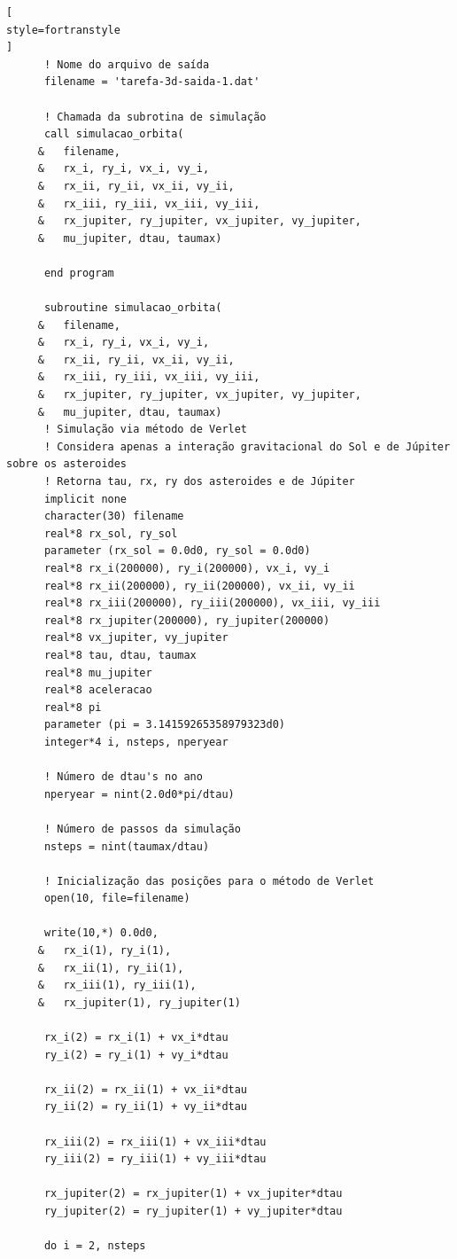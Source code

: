 \documentclass[12pt,a4paper]{article}
\begin{document}
\begin{lstlisting}[
style=fortranstyle
]
      ! Nome do arquivo de saída
      filename = 'tarefa-3d-saida-1.dat'

      ! Chamada da subrotina de simulação
      call simulacao_orbita(
     &   filename,
     &   rx_i, ry_i, vx_i, vy_i,
     &   rx_ii, ry_ii, vx_ii, vy_ii,
     &   rx_iii, ry_iii, vx_iii, vy_iii,
     &   rx_jupiter, ry_jupiter, vx_jupiter, vy_jupiter,
     &   mu_jupiter, dtau, taumax)

      end program

      subroutine simulacao_orbita(
     &   filename,
     &   rx_i, ry_i, vx_i, vy_i,
     &   rx_ii, ry_ii, vx_ii, vy_ii,
     &   rx_iii, ry_iii, vx_iii, vy_iii,
     &   rx_jupiter, ry_jupiter, vx_jupiter, vy_jupiter,
     &   mu_jupiter, dtau, taumax)
      ! Simulação via método de Verlet
      ! Considera apenas a interação gravitacional do Sol e de Júpiter sobre os asteroides
      ! Retorna tau, rx, ry dos asteroides e de Júpiter
      implicit none
      character(30) filename
      real*8 rx_sol, ry_sol
      parameter (rx_sol = 0.0d0, ry_sol = 0.0d0)
      real*8 rx_i(200000), ry_i(200000), vx_i, vy_i
      real*8 rx_ii(200000), ry_ii(200000), vx_ii, vy_ii
      real*8 rx_iii(200000), ry_iii(200000), vx_iii, vy_iii
      real*8 rx_jupiter(200000), ry_jupiter(200000)
      real*8 vx_jupiter, vy_jupiter
      real*8 tau, dtau, taumax
      real*8 mu_jupiter
      real*8 aceleracao
      real*8 pi
      parameter (pi = 3.14159265358979323d0)
      integer*4 i, nsteps, nperyear

      ! Número de dtau's no ano
      nperyear = nint(2.0d0*pi/dtau)

      ! Número de passos da simulação
      nsteps = nint(taumax/dtau)

      ! Inicialização das posições para o método de Verlet
      open(10, file=filename)

      write(10,*) 0.0d0,
     &   rx_i(1), ry_i(1),
     &   rx_ii(1), ry_ii(1),
     &   rx_iii(1), ry_iii(1),
     &   rx_jupiter(1), ry_jupiter(1)

      rx_i(2) = rx_i(1) + vx_i*dtau
      ry_i(2) = ry_i(1) + vy_i*dtau

      rx_ii(2) = rx_ii(1) + vx_ii*dtau
      ry_ii(2) = ry_ii(1) + vy_ii*dtau

      rx_iii(2) = rx_iii(1) + vx_iii*dtau
      ry_iii(2) = ry_iii(1) + vy_iii*dtau

      rx_jupiter(2) = rx_jupiter(1) + vx_jupiter*dtau
      ry_jupiter(2) = ry_jupiter(1) + vy_jupiter*dtau

      do i = 2, nsteps


\end{lstlisting}
\end{document}
